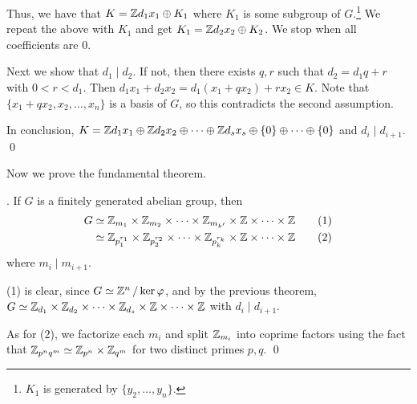 Thus, we have that \(K = \mathbb{Z} d_1 x_1 \oplus K_1\) where \(K_1\) is some subgroup of \(G\).\footnote{\(K_1\) is generated by \(\{y_2, \dots, y_n\}\).} We repeat the above with \(K_1\) and get \(K_1 = \mathbb{Z} d_2 x_2 \oplus K_2\). We stop when all coefficients are \(0\).

 Next we show that \(d_1 \mid d_2\). If not, then there exists \(q, r\) such that \(d_2 = d_1q+r\) with \(0 < r < d_1\). Then \(d_1x_1 + d_2x_2 = d_1(x_1 + qx_2) + rx_2 \in K\). Note that \(\{x_1 + qx_2, x_2, \dots, x_n\}\) is a basis of \(G\), so this contradicts the second assumption.

In conclusion, \(K = \mathbb{Z} d_1 x_1 \oplus \mathbb{Z} d_2 x_2 \oplus \cdots \oplus \mathbb{Z} d_s x_s \oplus \{0\} \oplus \cdots \oplus \{0\}\) and \(d_i \mid d_{i+1}\). \qed

\medskip

Now we prove the fundamental theorem.

\thm. If \(G\) is a finitely generated abelian group, then
\[
    \begin{aligned}
        G & \simeq \mathbb{Z}_{m_1} \times \mathbb{Z}_{m_2} \times \cdots \times \mathbb{Z}_{m_{k'}} \times \mathbb{Z} \times \cdots \times \mathbb{Z} \qquad (1)                \\
          & \simeq \mathbb{Z}_{p_1^{r_1}} \times \mathbb{Z}_{p_2^{r_2}} \times \cdots \times \mathbb{Z}_{p_k^{r_k}} \times \mathbb{Z} \times \cdots \times \mathbb{Z} \qquad (2)
    \end{aligned}
\]
where \(m_i \mid m_{i+1}\).

\pf (1) is clear, since \(G \simeq \mathbb{Z}^n \operatorname{/} \ker \varphi\), and by the previous theorem, \(G \simeq \mathbb{Z}_{d_1} \times \mathbb{Z}_{d_2} \times \cdots \times \mathbb{Z}_{d_s} \times \mathbb{Z} \times \cdots \times \mathbb{Z}\) with \(d_i \mid d_{i+1}\).

As for (2), we factorize each \(m_i\) and split \(\mathbb{Z}_{m_i}\) into coprime factors using the fact that \(\mathbb{Z}_{p^nq^m} \simeq \mathbb{Z}_{p^n} \times \mathbb{Z}_{q^m}\) for two distinct primes \(p, q\). \qed

\pagebreak
